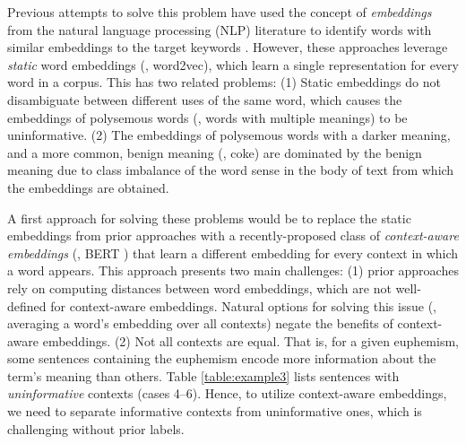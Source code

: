 Previous attempts to solve this problem have used the concept of \emph{embeddings} from the natural language processing (NLP) literature to identify words with similar embeddings to the target keywords \cite{takuro2020codewords,magu2018determining,yuan2018reading,zhao2016chinese}.
However, these approaches leverage \emph{static} word embeddings (\eg, word2vec), which learn a single representation  for every word in a corpus.  
This has two related problems:
(1) Static embeddings do not disambiguate between different uses of the same word, which causes the embeddings of polysemous words (\ie, words with multiple meanings) to be uninformative. 
(2) The embeddings of polysemous words with a darker meaning, and a more common, benign meaning (\eg, coke) are dominated by the benign meaning due to class imbalance of the word sense in the body of text from which the embeddings are obtained. 

A first approach for solving these problems would be to replace the static embeddings from prior approaches with a recently-proposed class of \emph{context-aware embeddings} (\eg, BERT \cite{devlin2019bert}) that learn a different embedding for every context in which a word appears.
This approach presents two main challenges: 
(1) prior approaches rely on computing distances between word embeddings, which are not well-defined for context-aware embeddings.
Natural options for solving this issue (\eg, averaging a word's embedding over all contexts) negate the benefits of context-aware embeddings.  
(2) Not all contexts are equal. 
That is, for a given euphemism, some sentences containing the euphemism encode more information about the term's meaning than others. 
Table \ref{table:example3} lists sentences with \emph{uninformative} contexts (cases 4--6).
Hence, to utilize context-aware embeddings, we need to separate informative contexts from uninformative ones, 
which is challenging without prior labels.



